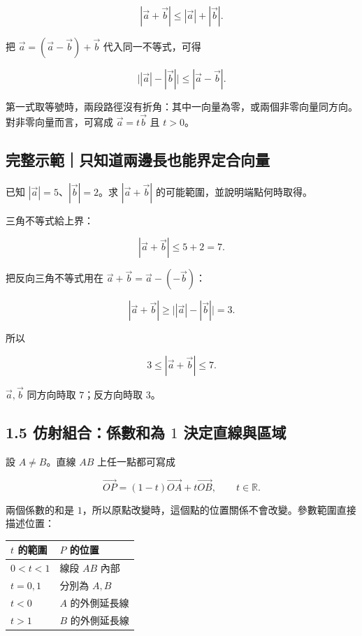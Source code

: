 \documentclass[11pt,a4paper]{article}
\newcounter{none}
\begin{document}
\[
\boxed{|\vec a+\vec b|\le|\vec a|+|\vec b|}.
\]

把 \(\vec a=(\vec a-\vec b)+\vec b\) 代入同一不等式，可得

\[
\boxed{\bigl||\vec a|-|\vec b|\bigr|\le|\vec a-\vec b|}.
\]

第一式取等號時，兩段路徑沒有折角：其中一向量為零，或兩個非零向量同方向。對非零向量而言，可寫成 \(\vec a=t\vec b\) 且 \(t>0\)。

\begin{HandoutWorkedExample}

\subsection{完整示範｜只知道兩邊長也能界定合向量}\label{ux5b8cux6574ux793aux7bc4ux53eaux77e5ux9053ux5169ux908aux9577ux4e5fux80fdux754cux5b9aux5408ux5411ux91cf}

已知 \(|\vec a|=5\)、\(|\vec b|=2\)。求 \(|\vec a+\vec b|\) 的可能範圍，並說明端點何時取得。

三角不等式給上界：

\[
|\vec a+\vec b|\le5+2=7.
\]

把反向三角不等式用在 \(\vec a+\vec b=\vec a-(-\vec b)\)：

\[
|\vec a+\vec b|\ge\bigl||\vec a|-|\vec b|\bigr|=3.
\]

所以

\[
\boxed{3\le|\vec a+\vec b|\le7}.
\]

\(\vec a,\vec b\) 同方向時取 \(7\)；反方向時取 \(3\)。

\end{HandoutWorkedExample}

\subsection{\texorpdfstring{1.5 仿射組合：係數和為 \(1\) 決定直線與區域}{1.5 仿射組合：係數和為 1 決定直線與區域}}\label{ux4effux5c04ux7d44ux5408ux4fc2ux6578ux548cux70ba-1-ux6c7aux5b9aux76f4ux7ddaux8207ux5340ux57df}

設 \(A\ne B\)。直線 \(AB\) 上任一點都可寫成

\[
\boxed{
\overrightarrow{OP}
=(1-t)\overrightarrow{OA}+t\overrightarrow{OB}
},
\qquad t\in\mathbb R.
\]

兩個係數的和是 \(1\)，所以原點改變時，這個點的位置關係不會改變。參數範圍直接描述位置：

{\def\LTcaptype{none} %
\begin{longtable}[]{@{}ll@{}}
\toprule\noalign{}
\(t\) 的範圍 & \(P\) 的位置 \\
\midrule\noalign{}
\endhead
\bottomrule\noalign{}
\endlastfoot
\(0<t<1\) & 線段 \(AB\) 內部 \\
\(t=0,1\) & 分別為 \(A,B\) \\
\(t<0\) & \(A\) 的外側延長線 \\
\(t>1\) & \(B\) 的外側延長線 \\
\end{longtable}
}
\end{document}
